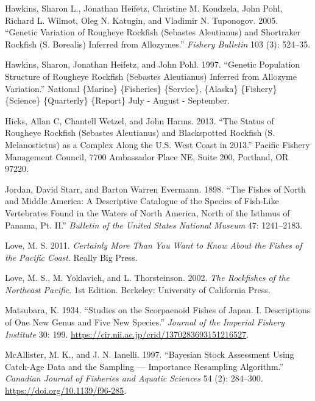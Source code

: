 \documentclass[
]{scrartcl}
\newlength{\cslhangindent}
\newenvironment{CSLReferences}[2] %
 {\begin{list}{}{%
  \setlength{\itemindent}{0pt}
  \setlength{\leftmargin}{0pt}
  \setlength{\parsep}{0pt}
  \ifodd #1
   \setlength{\leftmargin}{\cslhangindent}
   \setlength{\itemindent}{-1\cslhangindent}
  \fi
  \setlength{\itemsep}{#2\baselineskip}}}
 {\end{list}}
\begin{document}
\begin{CSLReferences}{1}{0}
Hawkins, Sharon L., Jonathan Heifetz, Christine M. Kondzela, John Pohl,
Richard L. Wilmot, Oleg N. Katugin, and Vladimir N. Tuponogov. 2005.
{``Genetic Variation of Rougheye Rockfish ({Sebastes} Aleutianus) and
Shortraker Rockfish ({S}. Borealis) Inferred from Allozymes.''}
\emph{Fishery Bulletin} 103 (3): 524--35.

Hawkins, Sharon, Jonathan Heifetz, and John Pohl. 1997. {``Genetic
Population Structure of Rougheye Rockfish ({Sebastes} Aleutianus)
Inferred from Allozyme Variation.''} National \{Marine\} \{Fisheries\}
\{Service\}, \{Alaska\} \{Fishery\} \{Science\} \{Quarterly\} \{Report\}
July - August - September.

Hicks, Allan C, Chantell Wetzel, and John Harms. 2013. {``The Status of
Rougheye Rockfish ({Sebastes} Aleutianus) and Blackspotted Rockfish
({S}. Melanostictus) as a Complex Along the {U}.{S}. {West} {Coast} in
2013.''} Pacific Fishery Management Council, 7700 Ambassador Place NE,
Suite 200, Portland, OR 97220.

Jordan, David Starr, and Barton Warren Evermann. 1898. {``The Fishes of
{North} and {Middle} {America}: {A} Descriptive Catalogue of the Species
of Fish-Like Vertebrates Found in the Waters of {North} {America}, North
of the {Isthmus} of {Panama}, Pt. {II}.''} \emph{Bulletin of the United
States National Museum} 47: 1241--2183.

Love, M. S. 2011. \emph{Certainly {More} {Than} {You} {Want} to {Know}
{About} the {Fishes} of the {Pacific} {Coast}}. Really Big Press.

Love, M. S., M. Yoklavich, and L. Thorsteinson. 2002. \emph{The
{Rockfishes} of the {Northeast} {Pacific}}. 1st Edition. Berkeley:
University of California Press.

Matsubara, K. 1934. {``Studies on the Scorpaenoid Fishes of Japan. I.
Descriptions of One New Genus and Five New Species.''} \emph{Journal of
the Imperial Fishery Institute} 30: 199.
\url{https://cir.nii.ac.jp/crid/1370283693151216527}.

McAllister, M. K., and J. N. Ianelli. 1997. {``Bayesian Stock Assessment
Using Catch-Age Data and the Sampling --- Importance Resampling
Algorithm.''} \emph{Canadian Journal of Fisheries and Aquatic Sciences}
54 (2): 284--300. \url{https://doi.org/10.1139/f96-285}.


\end{CSLReferences}
\end{document}
